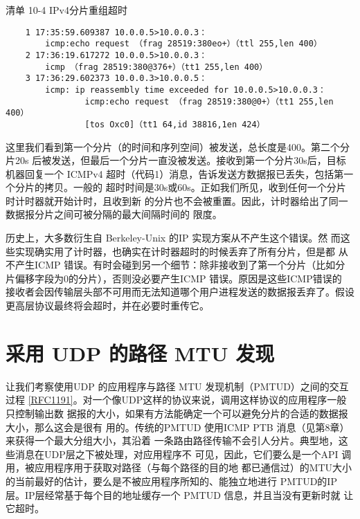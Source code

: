 清单 10-4 IPv4分片重组超时

\begin{verbatim}
    1 17:35:59.609387 10.0.0.5>10.0.0.3：
        icmp:echo request （frag 28519:380eo+）（ttl 255,len 400）
    2 17:36:19.617272 10.0.0.5>10.0.0.3：
        icmp （frag 28519:380@376+）（tt1 255,len 400）
    3 17:36:29.602373 10.0.0.3>10.0.0.5：
        icmp: ip reassembly time exceeded for 10.0.0.5>10.0.0.3：
                icmp:echo request （frag 28519:380@0+）（tt1 255,len 400）
                [tos Oxc0]（tt1 64,id 38816,1en 424）
\end{verbatim}

这里我们看到第一个分片（的时间和序列空间）被发送，总长度是400。第二个分片20s
后被发送，但最后一个分片一直没被发送。接收到第一个分片30s后，目标机器回复一个
ICMPv4 超时（代码1）消息，告诉发送方数据报已丢失，包括第一个分片的拷贝。一般的
超时时间是30s或60s。正如我们所见，收到任何一个分片时计时器就开始计时，且收到新
的分片也不会被重置。因此，计时器给出了同一数据报分片之间可被分隔的最大间隔时间的
限度。

\begin{tcolorbox}
  历史上，大多数衍生自 Berkeley-Unix 的IP 实现方案从不产生这个错误。然
  而这些实现确实用了计时器，也确实在计时器超时的时候丢弃了所有分片，但是都
  从不产生ICMP 错误。有时会碰到另一个细节：除非接收到了第一个分片（比如分
  片偏移字段为0的分片），否则没必要产生ICMP 错误。原因是这些ICMP错误的
  接收者会因传输层头部不可用而无法知道哪个用户进程发送的数据报丢弃了。假设
  更高层协议最终将会超时，并在必要时重传它。
\end{tcolorbox}

\section{采用 UDP 的路径 MTU 发现}

让我们考察使用UDP 的应用程序与路径 MTU 发现机制（PMTUD）之间的交互过程
\href{https://www.rfc-editor.org/rfc/rfc1191}{[RFC1191]}。对一个像UDP这样的协议来说，调用这样协议的应用程序一般只控制输出数
据报的大小，如果有方法能确定一个可以避免分片的合适的数据报大小，那么这会是很有
用的。传统的PMTUD 使用ICMP PTB 消息（见第8章）来获得一个最大分组大小，其沿着
一条路由路径传输不会引人分片。典型地，这些消息在UDP层之下被处理，对应用程序不
可见，因此，它们要么是一个API 调用，被应用程序用于获取对路径（与每个路径的目的地
都已通信过）的MTU大小的当前最好的估计，要么是不被应用程序所知的、能独立地进行
PMTUD的IP层。IP层经常基于每个目的地址缓存一个 PMTUD 信息，并且当没有更新时就
让它超时。

